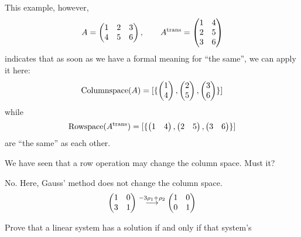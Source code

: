 \begin{exercises}
\begin{answer}
      This example, however,
      \begin{equation*}
         A=\begin{pmatrix}
             1  &2  &3  \\
             4  &5  &6
           \end{pmatrix},
         \qquad
         {{A}^{\rm trans}}=\begin{pmatrix}
             1  &4  \\
             2  &5  \\
             3  &6
           \end{pmatrix}
      \end{equation*}
      indicates that as soon as we have a formal meaning for ``the same'',
      we can apply it here:
      \begin{equation*}
        \mathop{{\mbox{Columnspace}}}(A)=\relax [\mbox{$\{
                        \begin{pmatrix} 1 \\ 4 \end{pmatrix},
                        \begin{pmatrix} 2 \\ 5 \end{pmatrix},
                        \begin{pmatrix} 3 \\ 6 \end{pmatrix} \}$}  \relax ]
      \end{equation*}
      while
      \begin{equation*}
         \mathop{{\mbox{Rowspace}}}({{A}^{\rm trans}})=\relax [\mbox{$\{
                                 \begin{pmatrix} 1 &4 \end{pmatrix},
                                 \begin{pmatrix} 2 &5 \end{pmatrix},
                                 \begin{pmatrix} 3 &6 \end{pmatrix} \}$}  \relax ]
      \end{equation*}  
      are ``the same'' as each other.
    \end{answer}
  \recommended \item  
    We have seen that a row operation may change the column space.
    Must it?
    \begin{answer}
      No.
      Here, Gauss' method does not change the column space.
      \begin{equation*}
        \begin{pmatrix}
          1  &0  \\
          3  &1
        \end{pmatrix}
        \mathrel{ \mathop{\longrightarrow}\limits^{-3\rho_1+\rho_2\mathstrut}_{ \begin{subarray}{l} \relax \end{subarray}}}
        \begin{pmatrix}
          1  &0  \\
          0  &1
        \end{pmatrix}
      \end{equation*} 
    \end{answer}
  \item
    Prove that a linear system has a solution if and only if that system's

\end{exercises}
